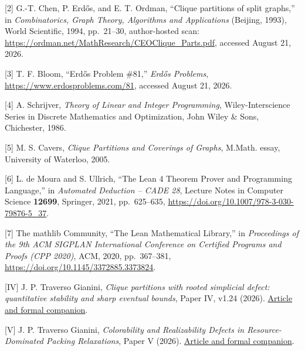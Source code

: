 \documentclass[english,11pt,a4paper]{article}
\begin{document}
{[}2{]} G.-T. Chen, P. Erdős, and E. T. Ordman, ``Clique partitions of
split graphs,'' in \emph{Combinatorics, Graph Theory, Algorithms and
Applications} (Beijing, 1993), World Scientific, 1994, pp.~21--30,
author-hosted scan:
\url{https://ordman.net/MathResearch/CEOClique_Parts.pdf}, accessed
August 21, 2026.

{[}3{]} T. F. Bloom, ``Erdős Problem \#81,'' \emph{Erdős Problems},
\url{https://www.erdosproblems.com/81}, accessed August 21, 2026.

{[}4{]} A. Schrijver, \emph{Theory of Linear and Integer Programming},
Wiley-Interscience Series in Discrete Mathematics and Optimization, John
Wiley \& Sons, Chichester, 1986.

{[}5{]} M. S. Cavers, \emph{Clique Partitions and Coverings of Graphs},
M.Math. essay, University of Waterloo, 2005.

{[}6{]} L. de Moura and S. Ullrich, ``The Lean 4 Theorem Prover and
Programming Language,'' in \emph{Automated Deduction -- CADE 28},
Lecture Notes in Computer Science \textbf{12699}, Springer, 2021,
pp.~625--635, \url{https://doi.org/10.1007/978-3-030-79876-5_37}.

{[}7{]} The mathlib Community, ``The Lean Mathematical Library,'' in
\emph{Proceedings of the 9th ACM SIGPLAN International Conference on
Certified Programs and Proofs (CPP 2020)}, ACM, 2020, pp.~367--381,
\url{https://doi.org/10.1145/3372885.3373824}.

{[}IV{]} J. P. Traverso Gianini, \emph{Clique partitions with rooted
simplicial defect: quantitative stability and sharp eventual bounds},
Paper IV, v1.24 (2026).
\href{https://github.com/jtraverso/erdos-81-chordal-clique-partitions/tree/eb335845bfa23375d5040ea31fc4f4b366346287/preprints/PAPER_IV}{Article
and formal companion}.

{[}V{]} J. P. Traverso Gianini, \emph{Colorability and Realizability
Defects in Resource-Dominated Packing Relaxations}, Paper V (2026).
\href{https://github.com/jtraverso/erdos-81-chordal-clique-partitions/tree/eb335845bfa23375d5040ea31fc4f4b366346287/preprints/PAPER_V}{Article
and formal companion}.
\end{document}
